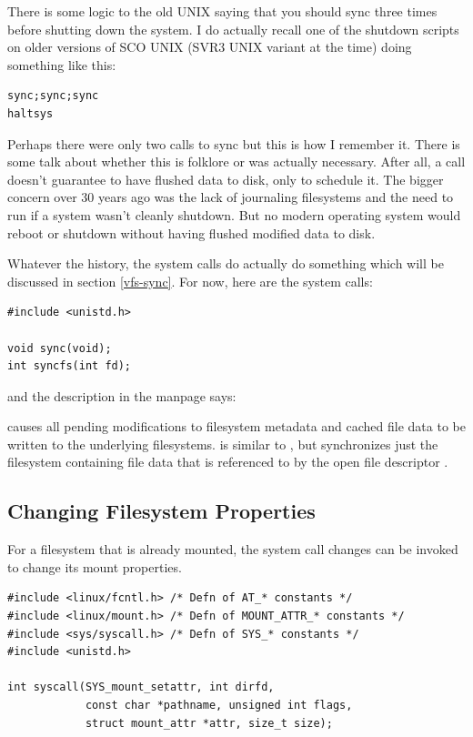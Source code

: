 There is some logic to the old UNIX saying that you should sync three times before shutting down the system. I do actually recall one of the shutdown scripts on older versions of SCO UNIX (SVR3 UNIX variant at the time) doing something like this:

\begin{lstlisting}
sync;sync;sync 
haltsys
\end{lstlisting}

\noindent
Perhaps there were only two calls to sync but this is how I remember it. There is some talk about whether this is folklore or was actually necessary. After all, a  call doesn't guarantee to have flushed data to disk, only to schedule it. The bigger concern over 30 years ago was the lack of journaling filesystems and the need to run  if a system wasn't cleanly shutdown. But no modern operating system would reboot or shutdown without having flushed modified data to disk.

Whatever the history, the system calls do actually do something which will be discussed in section \ref{vfs-sync}. For now, here are the system calls:

\begin{lstlisting}
#include <unistd.h>

void sync(void);
int syncfs(int fd);
\end{lstlisting}

\noindent
and the description in the manpage says:

 causes all pending modifications to filesystem metadata and cached file data to be written to the underlying filesystems.
 is similar to , but synchronizes just the filesystem containing file data that is referenced to by the open file descriptor .


\subsection{Changing Filesystem Properties}

For a filesystem that is already mounted, the  system call changes can be invoked to change its mount properties.

\begin{lstlisting}
#include <linux/fcntl.h> /* Defn of AT_* constants */ 
#include <linux/mount.h> /* Defn of MOUNT_ATTR_* constants */ 
#include <sys/syscall.h> /* Defn of SYS_* constants */ 
#include <unistd.h>

int syscall(SYS_mount_setattr, int dirfd,    
            const char *pathname, unsigned int flags, 
            struct mount_attr *attr, size_t size);
\end{lstlisting}

